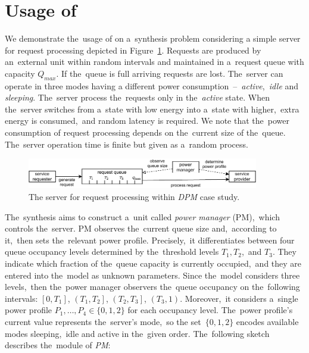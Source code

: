 \section{Usage of \toolname{}} \label{sec:dpm}
We demonstrate the~usage of \toolname{} on a~synthesis problem considering a simple server for request processing depicted in Figure~\ref{fig:dpm}. 
Requests are produced by an~external unit within random intervals and maintained in a~request queue with capacity $Q_{max}$.
If the~queue is full arriving requests are lost.
The~server can operate in three modes having a different power consumption \,--\, \textit{active},~\textit{idle} and \textit{sleeping}.
The~server process the~requests only in the~\textit{active} state.
When the~server switches from a~state with low energy into a~state with higher,~extra energy is consumed,~and random latency is required.
We note that the~power consumption of request processing depends on the~current size of the~queue.
The~server operation time is finite but given as a~random process.

\begin{figure}[h!]
\centering
\includegraphics[width=0.9\textwidth]{figures/dpm.pdf}
\caption{The server for request processing within \emph{DPM} case study.}%
\label{fig:dpm}%
\end{figure}

The~synthesis aims to construct a~unit called \textit{power manager} (PM),~which controls the~server.
PM observes the~current queue size and,~according to it,~then sets the~relevant power profile.
Precisely,~it differentiates between four queue occupancy levels determined by the~threshold levels $T_1,T_2$,~and $T_3$.
They indicate which fraction of the~queue capacity is currently occupied,~and they are entered into the~model as unknown parameters.
Since the~model considers three levels,~then the~power manager observers the~queue occupancy on the~following intervals: $\left[0, T_1 \right]$, $\left(T_1, T_2 \right]$, $\left(T_2, T_3 \right]$, $\left(T_3, 1 \right)$.
Moreover,~it considers a~single power profile $P_1,\dots,P_4 \in \{0,1,2\}$ for each occupancy level.
The~power profile's current value represents the~server's mode,~so the set~$\{0,1,2\}$ encodes available modes sleeping,~idle and active in the~given order.
The~following sketch describes the~module of \textit{PM}:

